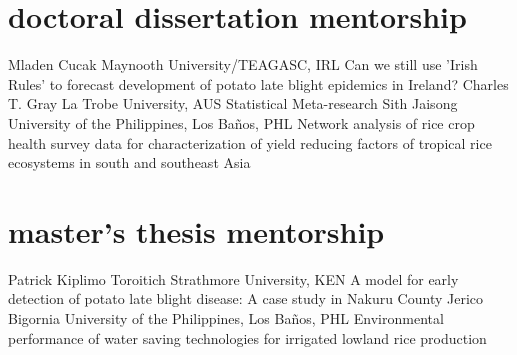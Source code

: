 \section*{doctoral dissertation mentorship}
\begin{entrylist}
    {Mladen Cucak {}}
    {Maynooth University/TEAGASC, IRL}
    {Can we still use 'Irish Rules' to forecast development of potato late blight epidemics in Ireland?}
    {Charles T. Gray {}}
    {La Trobe University, AUS}
    {Statistical Meta-research}
    {Sith Jaisong {}}
    {University of the Philippines, Los Ba\~nos, PHL}
    {Network analysis of rice crop health survey data for characterization of yield reducing factors of tropical rice ecosystems in south and southeast Asia}
\end{entrylist}

\section*{master's thesis mentorship}
\begin{entrylist}
    {Patrick Kiplimo Toroitich {}}
    {Strathmore University, KEN}
    {A model for early detection of potato late blight disease: A case study in Nakuru County}
    {Jerico Bigornia {}}
    {University of the Philippines, Los Ba\~nos, PHL}
    {Environmental performance of water saving technologies for irrigated lowland rice production}
\end{entrylist}
